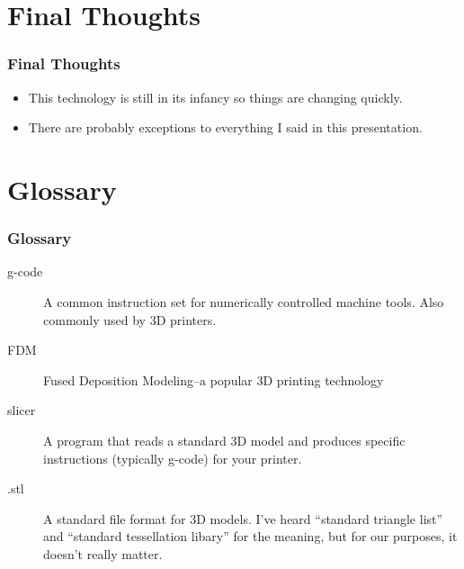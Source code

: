 \documentclass[english,10pt]{beamer}
\begin{document}
\section{Final Thoughts}
\begin{frame}
  \frametitle{Final Thoughts}
  \begin{itemize}
    \item This technology is still in its infancy so things are changing quickly.
    \item There are probably exceptions to everything I said in this presentation.
  \end{itemize}
\end{frame}

\section{Glossary}
\begin{frame}
  \frametitle{Glossary}
  \begin{description}
    \item [g-code] A common instruction set for numerically controlled machine tools.  Also commonly used by 3D printers.
    \item [FDM] Fused Deposition Modeling--a popular 3D printing technology
    \item [slicer] A program that reads a standard 3D model and produces specific instructions (typically g-code) for your printer.
    \item [.stl] A standard file format for 3D models.  I've heard ``standard triangle list'' and ``standard tessellation libary'' for the meaning, but for our purposes, it doesn't really matter.
  \end{description}
\end{frame}
\end{document}
